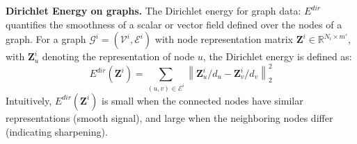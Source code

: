 
\textbf{Dirichlet Energy on graphs.} 
The Dirichlet energy for graph data: \( E^{dir} \) quantifies the smoothness of a scalar or vector field defined over the nodes of a graph. For a graph \( \mathcal{G}^i = (\mathcal{V}^i, \mathcal{E}^i) \) with node representation matrix \( \mathbf{Z}^i \in \mathbb{R}^{N_i \times m'} \), with \( \mathbf{Z}^i_u \) denoting the representation of node $u$, the Dirichlet energy is defined as:
\begin{equation}
E^{dir}(\mathbf{Z}^i) = \sum_{(u,v) \in \mathcal{E}^i} \left\| \mathbf{Z}^i_{u}/d_u - \mathbf{Z}^i_{v}/d_v \right\|_2^2
\label{eq:edir-edge}
\end{equation}
 Intuitively, $E^{dir}(\mathbf{Z}^i)$ is small when the connected nodes have similar representations (smooth signal), and large when the neighboring nodes differ (indicating sharpening).



